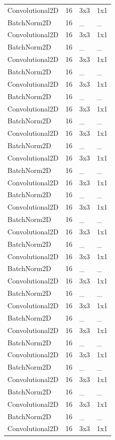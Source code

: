 \begin{center}
\begin{longtable}{|l|l|l|l|}
		\hline \hline
		\endlastfoot
		Convolutional2D & 16 & 3x3 & 1x1 \\
		BatchNorm2D & 16 & \_ & \_ \\ 
		Convolutional2D & 16 & 3x3 & 1x1 \\
		BatchNorm2D & 16 & \_ & \_ \\
		Convolutional2D & 16 & 3x3 & 1x1 \\
		BatchNorm2D & 16 & \_ & \_ \\
		Convolutional2D & 16 & 3x3 & 1x1 \\
		BatchNorm2D & 16 & \_ & \_ \\
		Convolutional2D & 16 & 3x3 & 1x1 \\
		BatchNorm2D & 16 & \_ & \_ \\
		Convolutional2D & 16 & 3x3 & 1x1 \\
		BatchNorm2D & 16 & \_ & \_ \\
		Convolutional2D & 16 & 3x3 & 1x1 \\
		BatchNorm2D & 16 & \_ & \_ \\
		Convolutional2D & 16 & 3x3 & 1x1 \\
		BatchNorm2D & 16 & \_ & \_ \\
		Convolutional2D & 16 & 3x3 & 1x1 \\
		BatchNorm2D & 16 & \_ & \_ \\
		Convolutional2D & 16 & 3x3 & 1x1 \\
		BatchNorm2D & 16 & \_ & \_ \\
		Convolutional2D & 16 & 3x3 & 1x1 \\
		BatchNorm2D & 16 & \_ & \_ \\
		Convolutional2D & 16 & 3x3 & 1x1 \\
		BatchNorm2D & 16 & \_ & \_ \\
		Convolutional2D & 16 & 3x3 & 1x1 \\
		BatchNorm2D & 16 & \_ & \_ \\
		Convolutional2D & 16 & 3x3 & 1x1 \\
		BatchNorm2D & 16 & \_ & \_ \\
		Convolutional2D & 16 & 3x3 & 1x1 \\
		BatchNorm2D & 16 & \_ & \_ \\
		Convolutional2D & 16 & 3x3 & 1x1 \\
		BatchNorm2D & 16 & \_ & \_ \\
		Convolutional2D & 16 & 3x3 & 1x1 \\
		BatchNorm2D & 16 & \_ & \_ \\
		Convolutional2D & 16 & 3x3 & 1x1 \\

\end{longtable}
\end{center}
